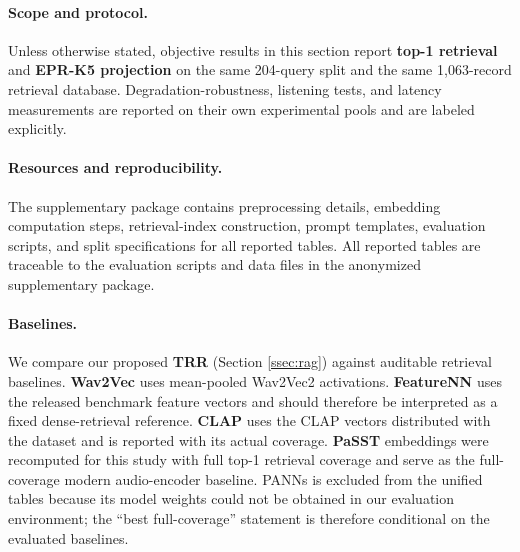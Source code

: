 \paragraph{Scope and protocol.}
Unless otherwise stated, objective results in this section report \textbf{top-1 retrieval} and \textbf{EPR-K5 projection} on the same 204-query split and the same 1,063-record retrieval database. Degradation-robustness, listening tests, and latency measurements are reported on their own experimental pools and are labeled explicitly.

\paragraph{Resources and reproducibility.}
\label{sec:repro}
The supplementary package contains preprocessing details, embedding computation steps, retrieval-index construction, prompt templates, evaluation scripts, and split specifications for all reported tables. All reported tables are traceable to the evaluation scripts and data files in the anonymized supplementary package.

\paragraph{Baselines.}
We compare our proposed \textbf{TRR} (Section \ref{ssec:rag}) against auditable retrieval baselines. \textbf{Wav2Vec} uses mean-pooled Wav2Vec2 activations. \textbf{FeatureNN} uses the released benchmark feature vectors and should therefore be interpreted as a fixed dense-retrieval reference. \textbf{CLAP} uses the CLAP vectors distributed with the dataset and is reported with its actual coverage. \textbf{PaSST} embeddings were recomputed for this study with full top-1 retrieval coverage and serve as the full-coverage modern audio-encoder baseline. PANNs is excluded from the unified tables because its model weights could not be obtained in our evaluation environment; the ``best full-coverage'' statement is therefore conditional on the evaluated baselines.

